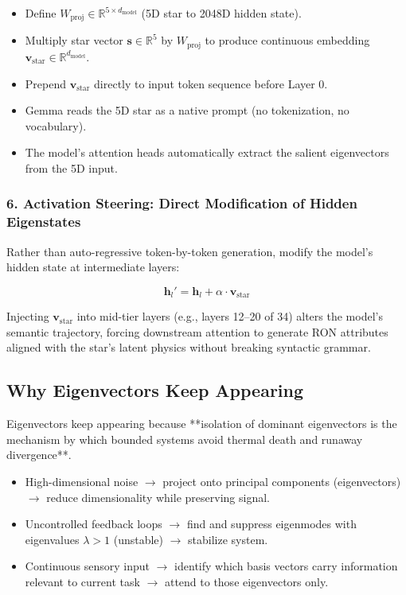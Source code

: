 \documentclass[11pt,oneside]{article}
\theoremstyle{definition}
\begin{document}
\begin{itemize}
  \item Define $W_{\text{proj}} \in \mathbb{R}^{5 \times d_{\text{model}}}$ (5D star to 2048D hidden state).
  \item Multiply star vector $\mathbf{s} \in \mathbb{R}^5$ by $W_{\text{proj}}$ to produce continuous embedding $\mathbf{v}_{\text{star}} \in \mathbb{R}^{d_{\text{model}}}$.
  \item Prepend $\mathbf{v}_{\text{star}}$ directly to input token sequence before Layer 0.
  \item Gemma reads the 5D star as a native prompt (no tokenization, no vocabulary).
  \item The model's attention heads automatically extract the salient eigenvectors from the 5D input.
\end{itemize}

\subsubsection{6. Activation Steering: Direct Modification of Hidden Eigenstates}

Rather than auto-regressive token-by-token generation, modify the model's hidden state at intermediate layers:

\[
\mathbf{h}_l' = \mathbf{h}_l + \alpha \cdot \mathbf{v}_{\text{star}}
\]

Injecting $\mathbf{v}_{\text{star}}$ into mid-tier layers (e.g., layers 12--20 of 34) alters the model's semantic trajectory, forcing downstream attention to generate RON attributes aligned with the star's latent physics without breaking syntactic grammar.

\subsection{Why Eigenvectors Keep Appearing}

Eigenvectors keep appearing because **isolation of dominant eigenvectors is the mechanism by which bounded systems avoid thermal death and runaway divergence**.

\begin{itemize}
  \item High-dimensional noise \ensuremath{\rightarrow} project onto principal components (eigenvectors) \ensuremath{\rightarrow} reduce dimensionality while preserving signal.
  \item Uncontrolled feedback loops \ensuremath{\rightarrow} find and suppress eigenmodes with eigenvalues $\lambda > 1$ (unstable) \ensuremath{\rightarrow} stabilize system.
  \item Continuous sensory input \ensuremath{\rightarrow} identify which basis vectors carry information relevant to current task \ensuremath{\rightarrow} attend to those eigenvectors only.
\end{itemize}
\end{document}
